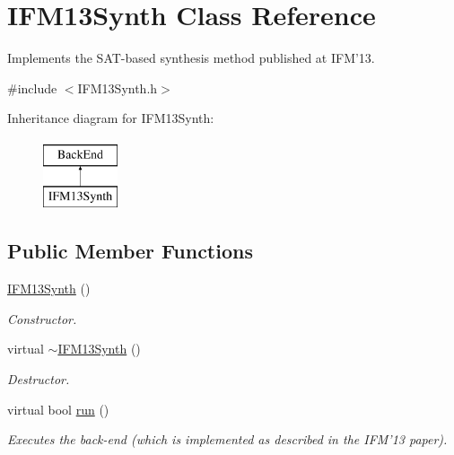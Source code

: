 \hypertarget{classIFM13Synth}{\section{I\-F\-M13\-Synth Class Reference}
\label{classIFM13Synth}
}


Implements the S\-A\-T-\/based synthesis method published at I\-F\-M'13.  




{\ttfamily \#include $<$I\-F\-M13\-Synth.\-h$>$}

Inheritance diagram for I\-F\-M13\-Synth\-:\begin{figure}[H]
\begin{center}
\leavevmode
\includegraphics[height=2.000000cm]{classIFM13Synth}
\end{center}
\end{figure}
\subsection*{Public Member Functions}
\begin{DoxyCompactItemize}
\item 
\hyperlink{classIFM13Synth_a4df6eb2628d3a8fd6462434a2adea84b}{I\-F\-M13\-Synth} ()
\begin{DoxyCompactList}\small\item\em Constructor. \end{DoxyCompactList}\item 
virtual \hyperlink{classIFM13Synth_ad042200b1639e702af49e55088a52f52}{$\sim$\-I\-F\-M13\-Synth} ()
\begin{DoxyCompactList}\small\item\em Destructor. \end{DoxyCompactList}\item 
virtual bool \hyperlink{classIFM13Synth_a42adb4f76d88199d92b1bedb58a139f8}{run} ()
\begin{DoxyCompactList}\small\item\em Executes the back-\/end (which is implemented as described in the I\-F\-M'13 paper). \end{DoxyCompactList}\end{DoxyCompactItemize}
